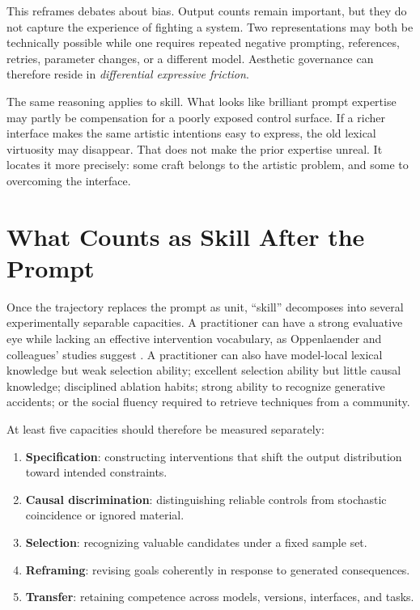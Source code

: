 \documentclass[11pt]{article}
\begin{document}
This reframes debates about bias. Output counts remain important, but they do not capture the experience of fighting a system. Two representations may both be technically possible while one requires repeated negative prompting, references, retries, parameter changes, or a different model. Aesthetic governance can therefore reside in \emph{differential expressive friction}.

The same reasoning applies to skill. What looks like brilliant prompt expertise may partly be compensation for a poorly exposed control surface. If a richer interface makes the same artistic intentions easy to express, the old lexical virtuosity may disappear. That does not make the prior expertise unreal. It locates it more precisely: some craft belongs to the artistic problem, and some to overcoming the interface.

\section{What Counts as Skill After the Prompt}

Once the trajectory replaces the prompt as unit, ``skill'' decomposes into several experimentally separable capacities. A practitioner can have a strong evaluative eye while lacking an effective intervention vocabulary, as Oppenlaender and colleagues' studies suggest \parencite{oppenlaender2023prompting}. A practitioner can also have model-local lexical knowledge but weak selection ability; excellent selection ability but little causal knowledge; disciplined ablation habits; strong ability to recognize generative accidents; or the social fluency required to retrieve techniques from a community.

At least five capacities should therefore be measured separately:

\begin{enumerate}[leftmargin=1.6em]
\item \textbf{Specification}: constructing interventions that shift the output distribution toward intended constraints.
\item \textbf{Causal discrimination}: distinguishing reliable controls from stochastic coincidence or ignored material.
\item \textbf{Selection}: recognizing valuable candidates under a fixed sample set.
\item \textbf{Reframing}: revising goals coherently in response to generated consequences.
\item \textbf{Transfer}: retaining competence across models, versions, interfaces, and tasks.
\end{enumerate}
\end{document}
